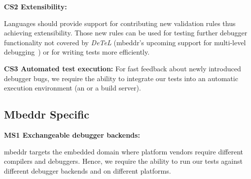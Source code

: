 \textbf{\label{CS2}CS2 Extensibility:} 

Languages should provide support for contributing new
validation rules thus achieving extensibility. Those new rules can be used for
testing further debugger functionality not covered by \emph{DeTeL} (\eg mbeddr's
upcoming support for multi-level debugging~\cite{MultiLevelDebugging:WSRE:breakedForInlining}) 
or for writing tests more efficiently.


\textbf{\label{CS3}CS3 Automated test execution:} For fast
feedback about newly introduced debugger bugs, 
we require the ability to integrate our 
tests into an automatic execution environment (\eg an  or a build
server).

\subsection{Mbeddr Specific}

\textbf{\label{MS1}MS1 Exchangeable debugger backends:}

mbeddr targets the embedded domain where platform vendors require different
compilers and debuggers. Hence, we require the ability to run our tests against
different debugger backends and on different platforms. 
